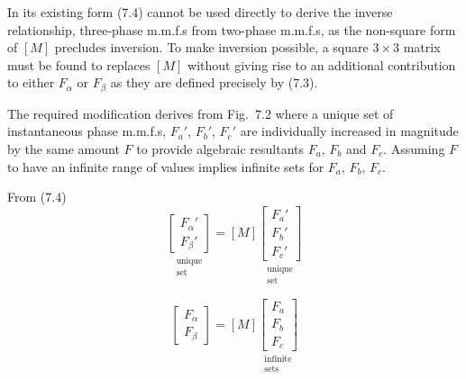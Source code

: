 \documentclass[a4paper,numbers=noenddot,12pt]{scrbook}
\begin{document}
    In its existing form (7.4) cannot be used directly to derive the inverse relationship, three-phase m.m.f.s from two-phase m.m.f.s, as the non-square form of $[M]$ precludes inversion. To make inversion possible, a square $3 \times 3$ matrix must be found to replaces $[M]$ without giving rise to an additional contribution to either $F_{\alpha}$ or $F_{\beta}$ as they are defined precisely by (7.3).

    The required modification derives from Fig.\ 7.2 where a unique set of instantaneous phase m.m.f.s, $F_a'$, $F_b'$, $F_c'$ are individually increased in magnitude by the same amount $F$ to provide algebraic resultants $F_a$, $F_b$ and $F_c$. Assuming $F$ to have an infinite range of values implies infinite sets for $F_a$, $F_b$, $F_c$.

    From (7.4)
    \begin{equation}
        \underset{\substack{\text{unique}\\ \text{set}}}
        {\begin{bmatrix}
            F_{\alpha}' \\ F_{\beta}'
        \end{bmatrix}}
        =
        [M]
        \underset{\substack{\text{unique} \\ \text{set}}}
        {\begin{bmatrix}
            F_a' \\ F_b' \\ F_c'
        \end{bmatrix}}
        \label{eq:Eq7.5}
    \end{equation}

    \begin{equation}
        \begin{bmatrix}
            F_{\alpha} \\ F_{\beta}
        \end{bmatrix}
        =
        [M]
        \underset{\substack{\text{infinite} \\ \text{sets}}}
        {\begin{bmatrix}
            F_a \\ F_b \\ F_c
        \end{bmatrix}}
        \label{eq:Eq7.6}
    \end{equation}
\end{document}
